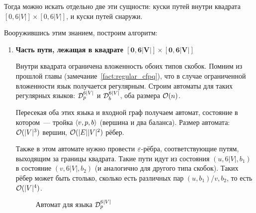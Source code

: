 Тогда можно искать отдельно две эти сущности: куски путей внутри квадрата $[0, 6|V|] \times [0, 6|V|]$, и куски путей снаружи.

Вооружившись этим знанием, построим алгоритм:

\begin{enumerate}
    \item {\bf Часть пути, лежащая в квадрате $\mathbf{[0, 6|V|] \times [0, 6|V|]}$}

    Внутри квадрата ограничена вложенность обоих типов скобок. Помним из прошлой главы (замечание~\ref{fact:regular_cfpq}), что в случае ограниченной вложенности язык получается регулярным. Строим автоматы для таких регулярных языков: $\mathcal{D}_p^{6|V|}$ и $\mathcal{D}_b^{6|V|}$, оба размера $\mathcal{O}(n)$.

    Пересекая оба этих языка и входной граф получаем автомат, состояние в котором~--- тройка $\langle v, p, b \rangle$ (вершина и два баланса). Размер автомата: $\mathcal{O}(|V|^3)$ вершин, $\mathcal{O}(|E||V|^2)$ рёбер.

    Также в этом автомате нужно провести $\varepsilon$-рёбра, соответствующие путям, выходящим за границы квадрата. Такие пути идут из состояния $(u, 6|V|, b_1)$ в состояние $(v, 6|V|, b_2)$ (и аналогично для другого типа скобок). Таких рёбер может быть столько, сколько есть различных пар $(u, b_1)$/$v, b_2$, то есть $\mathcal{O}(|V|^4)$.

    \begin{figure}[h]
      \centering
      \caption{Автомат для языка $\mathcal{D}_p^{6|V|}$}
      \label{img:dyck_6n_dfa}
    \end{figure}


\end{enumerate}
